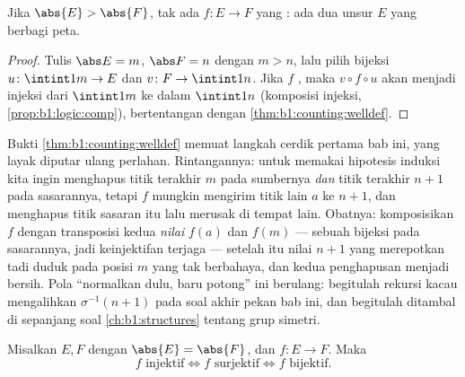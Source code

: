 \begin{corollary}\label{cor:b1:counting:pigeonhole}
Jika $\abs{E} > \abs{F}$, tak ada  $f \colon E \to F$ yang :
ada dua unsur $E$ yang berbagi peta.
\end{corollary}

\begin{proof}
Tulis $\abs E = m$, $\abs F = n$ dengan $m > n$, lalu pilih bijeksi
$u \colon \intint1m \to E$ dan $v \colon F \to \intint1n$. Jika $f$
, maka $v \circ f \circ u$ akan menjadi injeksi dari
$\intint1m$ ke dalam $\intint1n$ (komposisi injeksi,
\cref{prop:b1:logic:comp}), bertentangan dengan
\cref{thm:b1:counting:welldef}.
\end{proof}

\begin{remark}\label{rem:b1:counting:swapinterlude}
Bukti \cref{thm:b1:counting:welldef} memuat langkah cerdik pertama
bab ini, yang layak diputar ulang perlahan.
Rintangannya: untuk memakai hipotesis induksi kita ingin
menghapus titik terakhir $m$ pada sumbernya \emph{dan} titik terakhir
$n+1$ pada sasarannya, tetapi $f$ mungkin mengirim titik lain $a$ ke $n
+ 1$, dan menghapus titik sasaran itu lalu merusak 
di tempat lain. Obatnya: komposisikan $f$ dengan transposisi kedua
\emph{nilai} $f(a)$ dan $f(m)$ --- sebuah bijeksi pada
sasarannya, jadi keinjektifan terjaga --- setelah itu
nilai $n + 1$ yang merepotkan tadi duduk pada posisi $m$ yang tak berbahaya, dan
kedua penghapusan menjadi bersih. Pola ``normalkan dulu, baru potong''
ini berulang: begitulah rekursi  kacau mengalihkan
$\sigma^{-1}(n+1)$ pada soal akhir pekan bab ini, dan
begitulah  ditambal di sepanjang
soal \cref{ch:b1:structures} tentang grup simetri.
\end{remark}

\begin{proposition}\label{prop:b1:counting:injsur}
Misalkan $E, F$  dengan $\abs{E} = \abs{F}$, dan $f \colon E
\to F$. Maka
\[
f \text{ injektif} \iff f \text{ surjektif} \iff f \text{ bijektif}.
\]
\end{proposition}

